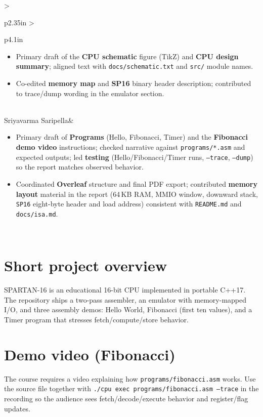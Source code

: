 \documentclass[12pt]{article}
\newcommand{\TeamMemberFour}{Sriyavarma Saripella}
\begin{document}
\begin{table}[h!]
\begin{tabular}{>{\raggedright\arraybackslash}p{2.35in} >{\raggedright\arraybackslash}p{4.1in}}
\begin{minipage}[t]{\linewidth}
\begin{itemize}
        \item Primary draft of the \textbf{CPU schematic} figure (TikZ) and \textbf{CPU design summary}; aligned text with \texttt{docs/schematic.txt} and \texttt{src/} module names.
        \item Co-edited \textbf{memory map} and \textbf{SP16} binary header description; contributed to trace/dump wording in the emulator section.
      \end{itemize}
    \end{minipage} \\
    \midrule
    \TeamMemberFour &
    \begin{minipage}[t]{\linewidth}\raggedright
      \begin{itemize}\setlength\itemsep{0.05em}
        \item Primary draft of \textbf{Programs} (Hello, Fibonacci, Timer) and the \textbf{Fibonacci demo video} instructions; checked narrative against \texttt{programs/*.asm} and expected outputs; led \textbf{testing} (Hello/Fibonacci/Timer runs, \texttt{--trace}, \texttt{--dump}) so the report matches observed behavior.
        \item Coordinated \textbf{Overleaf} structure and final PDF export; contributed \textbf{memory layout} material in the report (64\,KB RAM, MMIO window, downward stack, \texttt{SP16} eight-byte header and load address) consistent with \texttt{README.md} and \texttt{docs/isa.md}.
      \end{itemize}
    \end{minipage} \\
    \bottomrule
  \end{tabular}
\end{table}
\vfill
\clearpage

\section{Short project overview}
SPARTAN-16 is an educational 16-bit CPU implemented in portable C++17. The repository ships a two-pass assembler, an emulator with memory-mapped I/O, and three assembly demos: Hello World, Fibonacci (first ten values), and a Timer program that stresses fetch/compute/store behavior.

\section{Demo video (Fibonacci)}
The course requires a video explaining how \texttt{programs/fibonacci.asm} works. Use the source file together with \texttt{./cpu exec programs/fibonacci.asm --trace} in the recording so the audience sees fetch/decode/execute behavior and register/flag updates.
\end{document}
